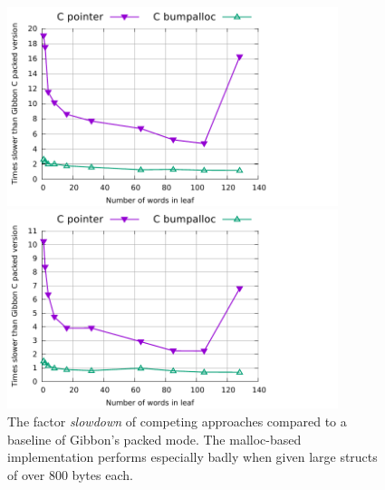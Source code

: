 \documentclass[a4paper,english]{lipics-v2016}
\begin{document}
\begin{figure}[t]
  \hspace{-4mm}
  \begin{minipage}{1.04\textwidth}
    \begin{minipage}{.49\textwidth}
      \centering
      \includegraphics[width=3.8in]{./figs/slowdown_leaves_build.pdf}
    \end{minipage}
    \begin{minipage}{.49\textwidth}
      \includegraphics[width=3.8in]{./figs/slowdown_leaves_add1.pdf}
    \end{minipage}
  \end{minipage}
  \vspace{-4mm}
  \caption{The factor {\em slowdown} of competing approaches compared to a
    baseline of Gibbon's packed mode.  The malloc-based implementation performs
    especially badly when given large structs of over 800 bytes each.}
  \label{fig:vary-leaves}
\end{figure}


\end{document}
